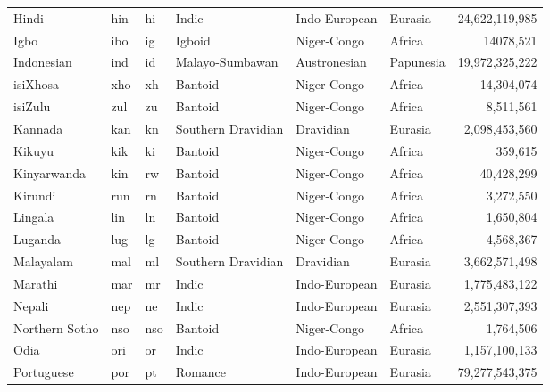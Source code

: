 \documentclass[twoside,11pt]{article}
\begin{document}
\begin{table}[]
{\begin{tabular}{lTTlllr}
Hindi               & hin       & hi          & Indic                   & Indo-European  & Eurasia   & 24,622,119,985   \\
Igbo                & ibo       & ig          & Igboid                  & Niger-Congo    & Africa    & 14078,521      \\
Indonesian          & ind       & id          & Malayo-Sumbawan         & Austronesian   & Papunesia & 19,972,325,222   \\
isiXhosa               & xho       & xh          & Bantoid                 & Niger-Congo    & Africa    & 14,304,074      \\
isiZulu            & zul       & zu          & Bantoid                 & Niger-Congo    & Africa    & 8,511,561       \\
Kannada             & kan       & kn          & Southern Dravidian      & Dravidian      & Eurasia   & 2,098,453,560    \\
Kikuyu              & kik       & ki          & Bantoid                 & Niger-Congo    & Africa    & 359,615        \\
Kinyarwanda         & kin       & rw          & Bantoid                 & Niger-Congo    & Africa    & 40,428,299      \\
Kirundi             & run       & rn          & Bantoid                 & Niger-Congo    & Africa    & 3,272,550       \\
Lingala             & lin       & ln          & Bantoid                 & Niger-Congo    & Africa    & 1,650,804       \\
Luganda             & lug       & lg          & Bantoid                 & Niger-Congo    & Africa    & 4,568,367       \\
Malayalam           & mal       & ml          & Southern Dravidian      & Dravidian      & Eurasia   & 3,662,571,498    \\
Marathi             & mar       & mr          & Indic                   & Indo-European  & Eurasia   & 1,775,483,122    \\
Nepali              & nep       & ne          & Indic                   & Indo-European  & Eurasia   & 2,551,307,393    \\
Northern Sotho      & nso       & nso         & Bantoid                 & Niger-Congo    & Africa    & 1,764,506       \\
Odia                & ori       & or          & Indic                   & Indo-European  & Eurasia   & 1,157,100,133    \\
Portuguese          & por       & pt          & Romance                 & Indo-European  & Eurasia   & 79,277,543,375   \\

\end{tabular}}
\end{table}
\end{document}
